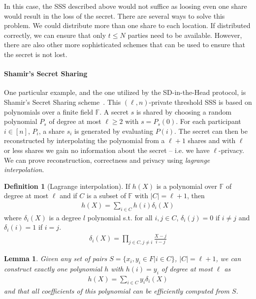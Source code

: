 \documentclass[11pt]{report}
\theoremstyle{definition}
\newtheorem{definition}{Definition}[section]
\theoremstyle{plain}
\newtheorem{lemma}{Lemma}[section]
\begin{document}
In this case, the SSS described above would not suffice as loosing even one share would result in the loss of the secret. There are several ways to solve this problem. We could distribute more than one share to each location. If distributed correctly, we can ensure that only $t \leq N$ parties need to be available. However, there are also other more sophisticated schemes that can be used to ensure that the secret is not lost.

\paragraph{Shamir's Secret Sharing}\label{sec:shamir}

One particular example, and the one utilized by the SD-in-the-Head protocol, is Shamir's Secret Sharing scheme~\cite{shamir1979share,cramer2015secure}. This $(\ell, n)$-private threshold SSS is based on polynomials over a finite field $\mathbb{F}$. A secret $s$ is shared by choosing a random polynomial $P_s$ of degree at most $\ell \geq 2$ with $s = P_s(0)$. For each participant $i \in [n]$, $P_i$, a share $s_i$ is generated by evaluating $P(i)$. The secret can then be reconstructed by interpolating the polynomial from a $\ell + 1$ shares and with $\ell$ or less shares we gain no information about the secret -- i.e. we have $\ell$-privacy. We can prove reconstruction, correctness and privacy using \textit{lagrange interpolation}.

\begin{definition}[Lagrange interpolation]\label{def:lagrange}
  If $h(X)$ is a polynomial over $\mathbb{F}$ of degree at most $\ell$ and if $C$ is a subset of $\mathbb{F}$ with $|C| = \ell + 1$, then
  \begin{align}\label{eq:lagrange1}
    h(X) = \sum_{i\in C}h(i)\delta_i(X)
  \end{align}
  where $\delta_i(X)$ is a degree $l$ polynomial s.t. for all $i,j \in C$, $\delta_i(j) = 0$ if $i \neq j$ and $\delta_i(i) = 1$ if $i = j$.
  \begin{align}\label{eq:lagrange2}
    \delta_i(X) = \prod_{j \in C,j\neq i} \frac{X-j}{i-j}
  \end{align}
\end{definition}

\begin{lemma}\label{lem:lagrange}
  Given any set of pairs $S = \{x_i, y_i \in F| i \in C\}$, $|C| = \ell + 1$, we can construct exactly one polynomial $h$ with $h(i) = y_i$ of degree at most $\ell$ as
  \begin{align*}
    h(X) = \sum_{i \in C} y_i \delta_i(X)
  \end{align*}
  \noindent and that all coefficients of this polynomial can be efficiently computed from $S$.
\end{lemma}
\end{document}
